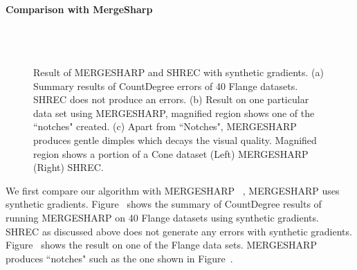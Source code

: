 \paragraph{Comparison with MergeSharp}
\begin{figure}[htb]
	\centering
	\\
	\\
	\caption{Result of  MERGESHARP and SHREC with synthetic gradients. (a) Summary results of  CountDegree errors of 40 Flange datasets. SHREC does not produce an errors. (b) Result on one particular data set using MERGESHARP, magnified region shows one of the ``notches" created. (c) Apart from ``Notches", MERGESHARP produces gentle dimples which decays the visual quality. Magnified region shows a portion of a Cone dataset (Left) MERGESHARP (Right) SHREC. }
	\label{fig:mergeSharpVShrec}
\end{figure}	
We first compare our algorithm with MERGESHARP ~\cite{bw-cisec-13}, MERGESHARP uses synthetic gradients. Figure~\protect{} shows the summary of CountDegree results of running MERGESHARP on 40 Flange datasets using synthetic gradients. SHREC as discussed above does not generate any errors with synthetic gradients. Figure~\protect{} shows the result on one of the Flange data sets. MERGESHARP produces ``notches" such as the one shown in Figure~\protect{}.

